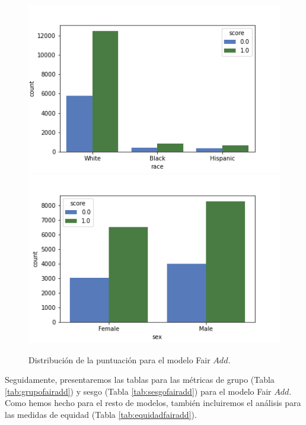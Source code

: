 \documentclass[oneside,openright,titlepage,numbers=noenddot,openany,headinclude,footinclude=true,
cleardoublepage=empty,abstractoff,BCOR=5mm,paper=a4,fontsize=12pt,main=spanish]{scrreprt}
\begin{document}
\begin{figure}[h]
      \includegraphics[width=\linewidth]{images/score_fair_add_race_law.png}
    \endminipage\hfill
      \includegraphics[width=\linewidth]{images/score_fair_add_sex_law.png}
    \endminipage
     \caption{Distribución de la puntuación para el modelo Fair $Add$.}
     \label{fig:scorefairadd}
\end{figure}

Seguidamente, presentaremos las tablas para las métricas de grupo (Tabla \ref{tab:grupofairadd}) y sesgo (Tabla \ref{tab:sesgofairadd}) para el modelo Fair $Add$. Como hemos hecho para el resto de modelos, también incluiremos el análisis para las medidas de equidad (Tabla \ref{tab:equidadfairadd}).\\
\end{document}
